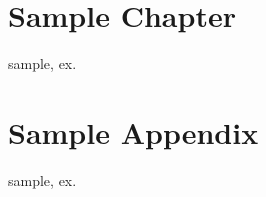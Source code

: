 \documentclass{report}
\begin{document}
\tableofcontents

\chapter{Sample Chapter}
\gls{sample}, \gls{ex}.

\printglossaries

\appendix
\chapter{Sample Appendix}

\gls{sample}, \gls{ex}.
\end{document}
